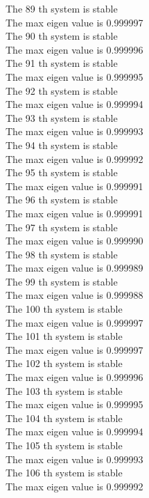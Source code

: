 \documentclass[11pt]{article}
\begin{document}
The 89 th system is stable \\
The max eigen value is 0.999997 \\
The 90 th system is stable \\
The max eigen value is 0.999996 \\
The 91 th system is stable \\
The max eigen value is 0.999995 \\
The 92 th system is stable \\
The max eigen value is 0.999994 \\
The 93 th system is stable \\
The max eigen value is 0.999993 \\
The 94 th system is stable \\
The max eigen value is 0.999992 \\
The 95 th system is stable \\
The max eigen value is 0.999991 \\
The 96 th system is stable \\
The max eigen value is 0.999991 \\
The 97 th system is stable \\
The max eigen value is 0.999990 \\
The 98 th system is stable \\
The max eigen value is 0.999989 \\
The 99 th system is stable \\
The max eigen value is 0.999988 \\
The 100 th system is stable \\
The max eigen value is 0.999997 \\
The 101 th system is stable \\
The max eigen value is 0.999997 \\
The 102 th system is stable \\
The max eigen value is 0.999996 \\
The 103 th system is stable \\
The max eigen value is 0.999995 \\
The 104 th system is stable \\
The max eigen value is 0.999994 \\
The 105 th system is stable \\
The max eigen value is 0.999993 \\
The 106 th system is stable \\
The max eigen value is 0.999992 \\
\end{document}
